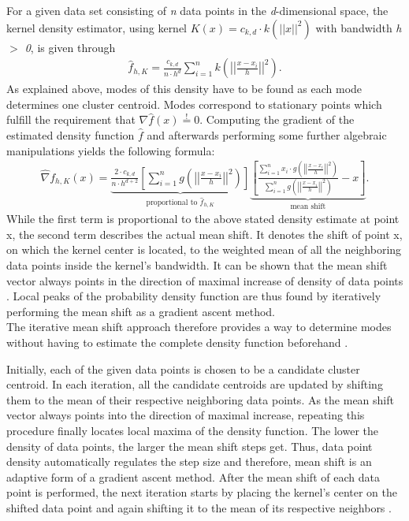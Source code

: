 For a given data set consisting of \textit{n} data points in the \textit{d}-dimensional space, the kernel density estimator, using kernel $K(x)=c_{k, d} \cdot k \left( ||x||^{2} \right)$ with bandwidth \textit{h $>$ 0}, is given through\\
\begin{align*}
	\hat{f}_{h, K} = \frac{c_{k, d}}{n \cdot h^{d}} \sum_{i=1}^{n} k \left( \left|\left|\frac{x - x_{i}}{h} \right|\right|^{2}\right).
\end{align*}
As explained above, modes of this density have to be found as each mode determines one cluster centroid. Modes correspond to stationary points which fulfill the requirement that $\nabla \hat{f}(x) \overset{!}{=} 0$. Computing the gradient of the estimated density function $\hat{f}$ and afterwards performing some further algebraic manipulations yields the following formula:
\begin{align*}
	\hat{\nabla} f_{h,K}(x) = \underbrace{\frac{2 \cdot c_{k, d}}{n \cdot h^{d+2}} \left[ \sum_{i=1}^{n} g \left( \left| \left| \frac{x-x_{i}}{h} \right| \right| ^{2} \right) \right]}_{\text{proportional to $\hat{f}_{h, K}$}}\underbrace{ \left[ \frac{\sum_{i=1}^{n} x_{i} \cdot g \left( \left| \left| \frac{x-x_{i}}{h} \right| \right| ^{2} \right)}{\sum_{i=1}^{n} g \left( \left| \left| \frac{x-x_{i}}{h} \right| \right| ^{2} \right)} - x \right]}_{\text{mean shift}}.
\end{align*}
While the first term is proportional to the above stated density estimate at point x, the second term describes the actual mean shift. It denotes the shift of point x, on which the kernel center is located, to the weighted mean of all the neighboring data points inside the kernel's bandwidth. It can be shown that the mean shift vector always points in the direction of maximal increase of density of data points \cite{comaniciu2002MeanShift}. 
Local peaks of the probability density function are thus found by iteratively performing the mean shift as a gradient ascent method.\\
The iterative mean shift approach therefore provides a way to determine modes without having to estimate the complete density function beforehand \cite{comaniciu2002MeanShift}.

Initially, each of the given data points is chosen to be a candidate cluster centroid. In each iteration, all the candidate centroids are updated by shifting them to the mean of their respective neighboring data points. As the mean shift vector always points into the direction of maximal increase, repeating this procedure finally locates local maxima of the density function.
The lower the density of data points, the larger the mean shift steps get. Thus, data point density automatically regulates the step size and therefore, mean shift is an adaptive form of a gradient ascent method. 
After the mean shift of each data point is performed, the next iteration starts by placing the kernel's center on the shifted data point and again shifting it to the mean of its respective neighbors \cite{400568}. 


